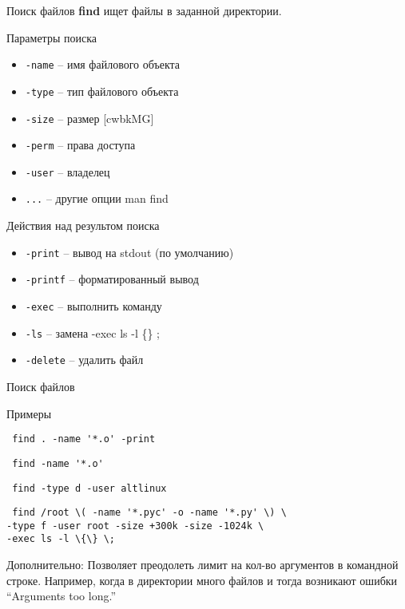 \begin{frame}[fragile]{Поиск файлов}
    \textbf{find} ищет файлы в заданной директории.
	\begin{block}{Параметры поиска}
		\begin{itemize}
			\item {\tt -name} -- имя файлового объекта
			\item {\tt -type} -- тип файлового объекта
			\item {\tt -size} -- размер [cwbkMG]
			\item {\tt -perm} -- права доступа
			\item {\tt -user} -- владелец
			\item {\tt ...} -- другие опции man find 
		\end{itemize}
	\end{block}
	\begin{block}{Действия над результом поиска}
		\begin{itemize}
			\item {\tt -print} -- вывод на stdout (по умолчанию)
			\item {\tt -printf} -- форматированный вывод
			\item {\tt -exec} -- выполнить команду
			\item {\tt -ls} -- замена -exec ls -l \{\} ;
			\item {\tt -delete} -- удалить файл
		\end{itemize}
	\end{block}
\end{frame}

\begin{frame}[fragile]{Поиск файлов}
	\begin{block}{Примеры}
            \begin{verbatim} find . -name '*.o' -print \end{verbatim}
            \begin{verbatim} find -name '*.o' \end{verbatim}
            \begin{verbatim} find -type d -user altlinux \end{verbatim}
            \begin{verbatim} find /root \( -name '*.pyc' -o -name '*.py' \) \
-type f -user root -size +300k -size -1024k \
-exec ls -l \{\} \; \end{verbatim}
	\end{block}
 Дополнительно:
 Позволяет преодолеть лимит на кол-во аргументов в командной строке. 
 Например, когда в директории много файлов и тогда возникают ошибки
 \textquotedblleft Arguments too long.\textquotedblright 
\end{frame}

